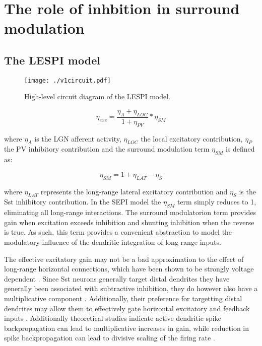 \section{The role of inhbition in surround modulation}


\subsection{The LESPI model}

\begin{figure}
	\centering
	\texttt{[image: ./v1circuit.pdf]}
	\caption[]{High-level circuit diagram of the LESPI model.}
    \label{circuit_diagram}
\end{figure}


\begin{equation}
  \eta_{exc} = \frac{\eta_{A} + \eta_{LOC}}{1 + \eta_{PV}} * \eta_{SM}
\end{equation}

where $\eta_{A}$ is the LGN afferent activity, $\eta_{LOC}$ the local
excitatory contribution, $\eta_{P}$ the PV inhibitory contribution
and the surround modulation term $\eta_{SM}$ is defined as:

\begin{equation}
  \eta_{SM} = 1 + \eta_{LAT} - \eta_{S}
\end{equation}

where $\eta_{LAT}$ represents the long-range lateral excitatory
contribution and $\eta_{S}$ is the Sst inhibitory contribution. In the
SEPI model the $\eta_{SM}$ term simply reduces to 1, eliminating all
long-range interactions. The surround modulatorion term provides gain
when excitation exceeds inhibition and shunting inhibition when the
reverse is true. As such, this term provides a convenient abstraction
to model the modulatory influence of the dendritic integration of
long-range inputs.

The effective excitatory gain may not be a bad approximation to the
effect of long-range horizontal connections, which have been shown to
be strongly voltage dependent \citep{Hirsch1991}. Since Sst neurons
generally target distal dendrites they have generally been associated
with subtractive inhibition, they do however also have a
multiplicative component \citep{Wilson2012}. Additionally, their
preference for targetting distal dendrites may allow them to
effectively gate horizontal excitatory and feedback inputs
\citep{Ma2011, Gentet2012}. Additionally theoretical studies indicate
active dendritic spike backpropagation can lead to multiplicative
increases in gain, while reduction in spike backpropagation can lead
to divisive scaling of the firing rate \citep{Mehaffey2005}.

